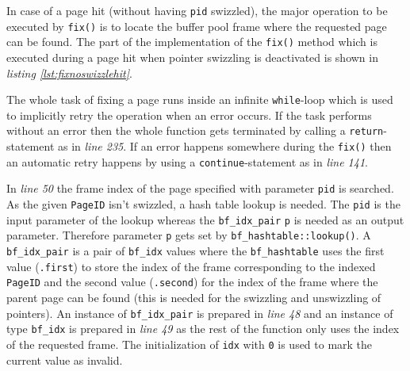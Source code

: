 	In case of a page hit (without having \lstinline{pid} swizzled), the major operation to be executed by \lstinline{fix()} is to locate the buffer pool frame where the requested page can be found. The part of the implementation of the \lstinline{fix()} method which is executed during a page hit when pointer swizzling is deactivated is shown in \emph{listing \ref{lst:fixnoswizzlehit}}.

	The whole task of fixing a page runs inside an infinite \lstinline{while}-loop which is used to implicitly retry the operation when an error occurs. If the task performs without an error then the whole function gets terminated by calling a \lstinline{return}-statement as in \emph{line 235}. If an error happens somewhere during the \lstinline{fix()} then an automatic retry happens by using a \lstinline{continue}-statement as in \emph{line 141}.

	In \emph{line 50} the frame index of the page specified with parameter \lstinline{pid} is searched. As the given \lstinline{PageID} isn't swizzled, a hash table lookup is needed. The \lstinline{pid} is the input parameter of the lookup whereas the \lstinline{bf_idx_pair} \lstinline{p} is needed as an output parameter. Therefore parameter \lstinline{p} gets set by \lstinline{bf_hashtable::lookup()}. A \lstinline{bf_idx_pair} is a pair of \lstinline{bf_idx} values where the \lstinline{bf_hashtable} uses the first value (\lstinline{.first}) to store the index of the frame corresponding to the indexed \lstinline{PageID} and the second value (\lstinline{.second}) for the index of the frame where the parent page can be found (this is needed for the swizzling and unswizzling of pointers). An instance of \lstinline{bf_idx_pair} is prepared in \emph{line 48} and an instance of type \lstinline{bf_idx} is prepared in \emph{line 49} as the rest of the function only uses the index of the requested frame. The initialization of \lstinline{idx} with \lstinline{0} is used to mark the current value as invalid.

\begin{@empty}
	\lstset{
		language = [ISO]C++,
		style = basic
	}
	\begin{code}[ht!]
		\caption{Implementation of \lstinline{bf_hashtable::lookup()}} \label{lst:bf_hashtablelookup}
		
	\end{code}
\end{@empty}

